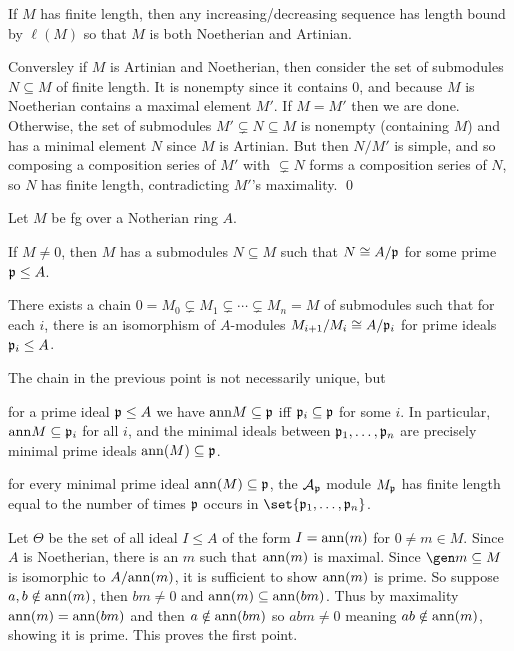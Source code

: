 \bproof

    If $M$ has finite length, then any increasing/decreasing sequence has length bound by $\ell(M)$ so that $M$ is both Noetherian and Artinian.

    Conversley if $M$ is Artinian and Noetherian, then consider the set of submodules $N\subseteq M$ of finite length.
    It is nonempty since it contains $0$, and because $M$ is Noetherian contains a maximal element $M'$.
    If $M=M'$ then we are done.
    Otherwise, the set of submodules $M'\subsetneq N\subseteq M$ is nonempty (containing $M$) and has a minimal element $N$ since $M$ is Artinian.
    But then $N/M'$ is simple, and so composing a composition series of $M'$ with $\subsetneq N$ forms a composition series of $N$, so $N$ has finite length, contradicting $M'$'s maximality.
    \qed

\eproof

\bprop

    Let $M$ be fg over a Notherian ring $A$.
    \benum
        \item If $M\neq0$, then $M$ has a submodules $N\subseteq M$ such that $N\cong A/{{\frak p}}$ for some prime ${{\frak p}}\leq A$.
        \item There exists a chain $0=M_0\subsetneq M_1\subsetneq\cdots\subsetneq M_n=M$ of submodules such that for each $i$, there is an isomorphism of $A$-modules
        $M_{i+1}/M_i\cong A/{{\frak p}}_i$ for prime ideals ${{\frak p}}_i\leq A$.
        \item The chain in the previous point is not necessarily unique, but
        \benum
            \item for a prime ideal ${{\frak p}}\leq A$ we have ${\rm ann} M\subseteq{{\frak p}}$ iff ${{\frak p}}_i\subseteq{{\frak p}}$ for some $i$.
            In particular, ${\rm ann} M\subseteq{{\frak p}}_i$ for all $i$, and the minimal ideals between ${{\frak p}}_1,\dots,{{\frak p}}_n$ are precisely minimal prime ideals ${\rm ann}(M)\subseteq{{\frak p}}$.
            \item for every minimal prime ideal ${\rm ann}(M)\subseteq{{\frak p}}$, the ${{\cal A}}_{{\frak p}}$ module $M_{{\frak p}}$ has finite length equal to the number of times ${{\frak p}}$ occurs in $\set{\p_1,\dots,\p_n}$.
        \eenum
    \eenum

\eprop

\bproof

    Let $\Theta$ be the set of all ideal $I\leq A$ of the form $I={\rm ann}(m)$ for $0\neq m\in M$.
    Since $A$ is Noetherian, there is an $m$ such that ${\rm ann}(m)$ is maximal.
    Since $\gen m\subseteq M$ is isomorphic to $A/{\rm ann}(m)$, it is sufficient to show ${\rm ann}(m)$ is prime.
    So suppose $a,b\notin{\rm ann}(m)$, then $bm\neq0$ and ${\rm ann}(m)\subseteq{\rm ann}(bm)$.
    Thus by maximality ${\rm ann}(m)={\rm ann}(bm)$ and then $a\notin{\rm ann}(bm)$ so $abm\neq0$ meaning $ab\notin{\rm ann}(m)$, showing it is prime.
    This proves the first point.

